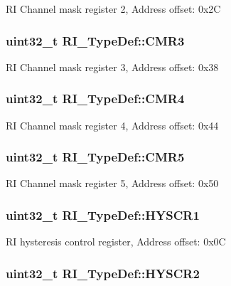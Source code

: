 R\-I Channel mask register 2, Address offset\-: 0x2\-C \hypertarget{struct_r_i___type_def_ada63b9af8e49cf86f4f5f84daf478681}{
\subsubsection[{C\-M\-R3}]{ uint32\-\_\-t R\-I\-\_\-\-Type\-Def\-::\-C\-M\-R3}}\label{struct_r_i___type_def_ada63b9af8e49cf86f4f5f84daf478681}
R\-I Channel mask register 3, Address offset\-: 0x38 \hypertarget{struct_r_i___type_def_ab315f735e34d8cf08f237985c14189de}{
\subsubsection[{C\-M\-R4}]{ uint32\-\_\-t R\-I\-\_\-\-Type\-Def\-::\-C\-M\-R4}}\label{struct_r_i___type_def_ab315f735e34d8cf08f237985c14189de}
R\-I Channel mask register 4, Address offset\-: 0x44 \hypertarget{struct_r_i___type_def_a8420afd46307f2496b891ace29b83d75}{
\subsubsection[{C\-M\-R5}]{ uint32\-\_\-t R\-I\-\_\-\-Type\-Def\-::\-C\-M\-R5}}\label{struct_r_i___type_def_a8420afd46307f2496b891ace29b83d75}
R\-I Channel mask register 5, Address offset\-: 0x50 \hypertarget{struct_r_i___type_def_a807f9b63b7cb1357354fb8f7e07bfbb0}{
\subsubsection[{H\-Y\-S\-C\-R1}]{ uint32\-\_\-t R\-I\-\_\-\-Type\-Def\-::\-H\-Y\-S\-C\-R1}}\label{struct_r_i___type_def_a807f9b63b7cb1357354fb8f7e07bfbb0}
R\-I hysteresis control register, Address offset\-: 0x0\-C \hypertarget{struct_r_i___type_def_a2b8a23d4df42b1d0ca4d902e1f13a61d}{
\subsubsection[{H\-Y\-S\-C\-R2}]{ uint32\-\_\-t R\-I\-\_\-\-Type\-Def\-::\-H\-Y\-S\-C\-R2}}\label{struct_r_i___type_def_a2b8a23d4df42b1d0ca4d902e1f13a61d}
